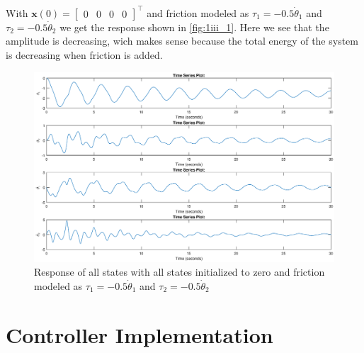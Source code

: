 \documentclass[a4paper]{scrartcl}
\begin{document}
\subsection{}
With $\bm{x}(0) = \begin{bmatrix}0 & 0 & 0 & 0\end{bmatrix}^\top$ and friction modeled as $\tau_1 = -0.5\dot{\theta}_1$ and $\tau_2 = -0.5\dot{\theta}_2$ we get the response shown in \autoref{fig:1iii_1}. Here we see that the amplitude is decreasing, wich makes sense because the total energy of the system is decreasing when friction is added.

\begin{figure}[ht!]
	\centering
	\includegraphics[width=.90\textwidth]{fig/1iii_1.eps}
	\caption{Response of all states with  all states initialized to zero and friction modeled as  $\tau_1 = -0.5\dot{\theta}_1$ and $\tau_2 = -0.5\dot{\theta}_2$ }
	\label{fig:1iii_1}
\end{figure}

\section{Controller Implementation}
\end{document}
